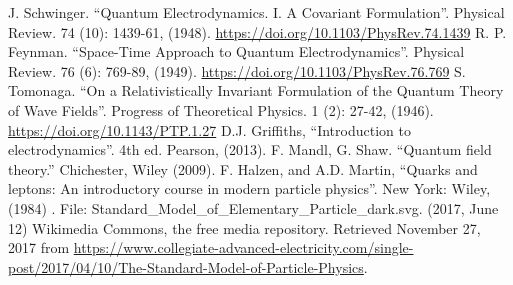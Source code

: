 \documentclass[print]{nuthesis}
\begin{document}


\nocite{*}
\begin{thebibliography}{300}
 J. Schwinger. ``Quantum Electrodynamics. I. A Covariant Formulation''. Physical Review. 74 (10): 1439-61, (1948). \url{https://doi.org/10.1103/PhysRev.74.1439} 
 R. P. Feynman. ``Space-Time Approach to Quantum Electrodynamics''. Physical Review. 76 (6): 769-89, (1949). \url{https://doi.org/10.1103/PhysRev.76.769}
 S. Tomonaga. ``On a Relativistically Invariant Formulation of the Quantum Theory of Wave Fields''. Progress of Theoretical Physics. 1 (2): 27-42, (1946). \url{https://doi.org/10.1143/PTP.1.27}
 D.J. Griffiths, ``Introduction to electrodynamics''. 4th ed. Pearson, (2013).
 F. Mandl, G. Shaw. ``Quantum field theory.'' Chichester, Wiley (2009).
 F. Halzen, and A.D. Martin, ``Quarks and leptons: An introductory course in modern particle physics''. New York: Wiley, (1984) .
 File: Standard\_Model\_of\_Elementary\_Particle\_dark.svg. (2017, June 12) Wikimedia Commons, the free media repository. Retrieved November 27, 2017 from \url{https://www.collegiate-advanced-electricity.com/single-post/2017/04/10/The-Standard-Model-of-Particle-Physics}.

\end{thebibliography}
\end{document}
